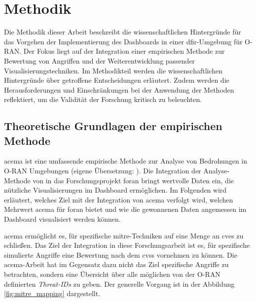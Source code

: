 \chapter{Methodik}
\label{chap:methodik}
Die Methodik dieser Arbeit beschreibt die wissenschaftlichen Hintergründe für das Vorgehen der Implementierung des Dashboards in einer \gls{dfir}-Umgebung für O-RAN. Der Fokus liegt auf der Integration einer empirischen Methode zur Bewertung von Angriffen und der Weiterentwicklung passender Visualisierungstechniken. Im Methodikteil werden die wissenschaftlichen Hintergründe über getroffene Entscheidungen erläutert. Zudem werden die Herausforderungen und Einschränkungen bei der Anwendung der Methoden reflektiert, um die Validität der Forschung kritisch zu beleuchten.
\section{Theoretische Grundlagen der empirischen Methode}
\label{sec:auswahlDerEmpirischenMethode}
\gls{acema} ist \glqq eine umfassende empirische Methode zur Analyse von Bedrohungen in O-RAN Umgebungen \grqq (eigene Übersetzung: \autocite{klementSecuring6GTransition2024}). Die Integration der Analyse-Methode von \citeauthor{klementSecuring6GTransition2024} in das Forschungsprojekt \gls{foran} bringt wertvolle Daten ein, die nützliche Visualisierungen im Dashboard ermöglichen. Im Folgenden wird erläutert, welches Ziel mit der Integration von \gls{acema} verfolgt wird, welchen Mehrwert \gls{acema} für \gls{foran} bietet und wie die gewonnenen Daten angemessen im Dashboard visualisiert werden können.
\par \gls{acema} ermöglicht es, für spezifische \gls{mitre}-Techniken auf eine Menge an \glspl{cve} zu schließen. Das Ziel der Integration in diese Forschungsarbeit ist es, für spezifische simulierte Angriffe eine Bewertung nach dem \gls{cvss} vornehmen zu können. Die \gls{acema}-Arbeit hat im Gegensatz dazu nicht das Ziel spezifische Angriffe zu betrachten, sondern eine Übersicht über alle möglichen von der O-RAN definierten \textit{Threat-IDs} zu geben. Der generelle Vorgang ist in der Abbildung \ref{fig:mitre_mapping} dargestellt.

